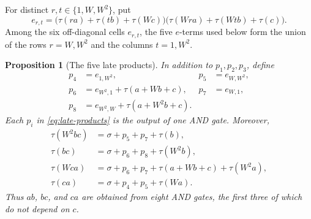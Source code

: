 \documentclass[11pt]{article}
\newtheorem{proposition}[theorem]{Proposition}
\begin{document}
For distinct \(r,t\in\{1,W,W^2\}\), put
\begin{equation}\label{eq:cell}
 e_{r,t}=
 \bigl(\tau(ra)+\tau(tb)+\tau(Wc)\bigr)
 \bigl(\tau(Wra)+\tau(Wtb)+\tau(c)\bigr).
\end{equation}
Among the six off-diagonal cells \(e_{r,t}\), the five \(e\)-terms used
below form the union of the rows \(r=W,W^2\) and the columns \(t=1,W^2\).

\begin{proposition}[The five late products]\label{prop:f4-joint}
In addition to \(p_1,p_2,p_3\), define
\begin{equation}\label{eq:late-products}
\begin{aligned}
 p_4&=e_{1,W^2},&
 p_5&=e_{W,W^2},\\
 p_6&=e_{W^2,1}+\tau(a+Wb+c),&
 p_7&=e_{W,1},\\
 p_8&=e_{W^2,W}+\tau(a+W^2b+c).
\end{aligned}
\end{equation}
Each \(p_i\) in \eqref{eq:late-products} is the output of one AND gate.
Moreover,
\begin{align}
 \tau(W^2bc)&=\sigma+p_5+p_7+\tau(b),
 \label{eq:bc-first}\\
 \tau(bc)&=\sigma+p_6+p_8+\tau(W^2b),
 \label{eq:bc-second}\\
 \tau(Wca)&=\sigma+p_6+p_7+\tau(a+Wb+c)+\tau(W^2a),
 \label{eq:ca-first}\\
 \tau(ca)&=\sigma+p_4+p_5+\tau(Wa).
 \label{eq:ca-second}
\end{align}
Thus \(ab\), \(bc\), and \(ca\) are obtained from eight AND gates,
the first three of which do not depend on \(c\).
\end{proposition}
\end{document}
